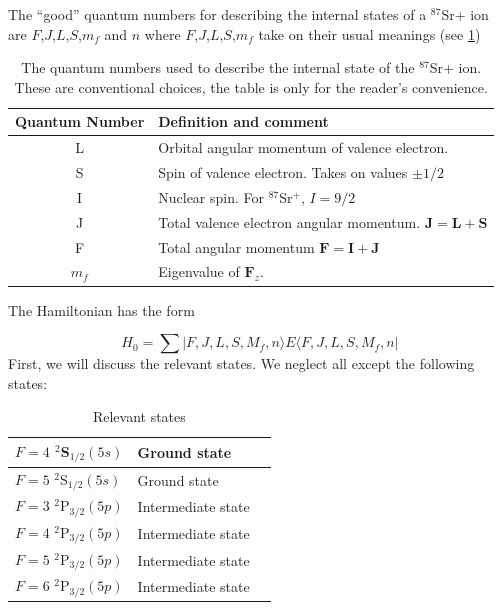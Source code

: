 The ``good'' quantum numbers for describing the internal states of a $^{87}$Sr+ ion are $F$,$J$,$L$,$S$,$m_f$ and $n$\cite{experimental_hyperfine_alkali_arimondo}\cite{cuaMITnotes} where $F$,$J$,$L$,$S$,$m_f$ take on their usual meanings (see \ref{quantumNumberQuickref})

\begin{table}[h!]
\centering
\begin{tabular}{|c|l|}
\hline
Quantum Number & Definition and comment \\ \hline \hline
L & Orbital angular momentum of valence electron. \\ \hline
S & Spin of valence electron. Takes on values $\pm 1/2$ \\ \hline
I & Nuclear spin. For $^{87}$Sr$^+$, $I=9/2$ \\ \hline
J & Total valence electron angular momentum. $\mathbf{J}=\mathbf{L}+\mathbf{S}$ \\ \hline
F & Total angular momentum $\mathbf{F}=\mathbf{I}+\mathbf{J}$ \\ \hline
$m_f$ & Eigenvalue of $\mathbf{F}_z$.\\ \hline
\end{tabular}
\caption{The quantum numbers used to describe the internal state of the $^{87}$Sr+ ion. These are conventional choices, the table is only for the reader's convenience.}
\label{quantumNumberQuickref}
\end{table}

The Hamiltonian has the form 

\begin{equation}
H_0=\sum |F,J,L,S,M_f,n\rangle E \langle F,J,L,S,M_f,n|
\end{equation}
First, we will discuss the relevant states. We neglect all except the following states: %
\begin{table}[h]
\centering
\begin{tabular}{|l|l|||r|}
\hline
$F=4$ $^2$S$_{1/2} (5s)$ & Ground state  \\ \hline
$F=5$ $^2$S$_{1/2} (5s)$ & Ground state  \\ \hline
$F=3$ $^2$P$_{3/2} (5p)$ & Intermediate state  \\ \hline
$F=4$ $^2$P$_{3/2} (5p)$ & Intermediate state  \\ \hline
$F=5$ $^2$P$_{3/2} (5p)$ & Intermediate state  \\ \hline
$F=6$ $^2$P$_{3/2} (5p)$ & Intermediate state  \\ \hline
\end{tabular}
\caption{Relevant states}
\label{tableOfStates}
\end{table}


